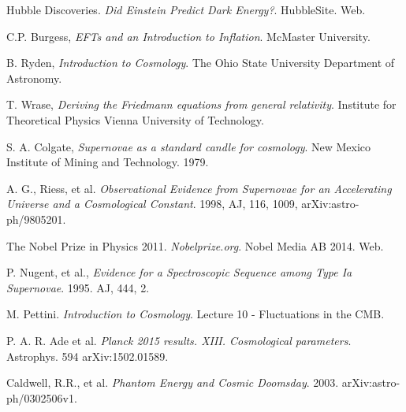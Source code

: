 \documentclass[12pt]{article}
\begin{document}
	\begin{thebibliography}{999}
	
	Hubble Discoveries. 
	\emph{Did Einstein Predict Dark Energy?}. 
	HubbleSite. Web.
	
  	C.P. Burgess,
  	\emph{EFTs and an Introduction to Inflation}.
  	McMaster University.
	
	B. Ryden, 
	\emph{Introduction to Cosmology}.
	The Ohio State University Department of Astronomy.
	
	T. Wrase,
	\emph{Deriving the Friedmann equations from general relativity}.
	Institute for Theoretical Physics Vienna University of Technology.
	
	S. A. Colgate, 
	\emph{Supernovae as a standard candle for cosmology}.
	New Mexico Institute of Mining and Technology. 1979.	
	
	A. G., Riess, et al.
	\emph{Observational Evidence from Supernovae for an Accelerating Universe and a Cosmological Constant}.
	1998, AJ, 116, 1009, arXiv:astro-ph/9805201.
	
	The Nobel Prize in Physics 2011. 
	\emph{Nobelprize.org}.
	Nobel Media AB 2014. Web. 
	
	P. Nugent, et al., 
	\emph{Evidence for a Spectroscopic Sequence among Type Ia Supernovae}.
	1995. AJ, 444, 2.
	
	M. Pettini. 
	\emph{Introduction to Cosmology}.
	Lecture 10 - Fluctuations in the CMB.
	
	 P. A. R. Ade et al. 
	\emph{Planck 2015 results. XIII. Cosmological parameters}.
	Astrophys. 594 arXiv:1502.01589. 
	
	 Caldwell, R.R., et al.
	 \emph{Phantom Energy and Cosmic Doomsday}.
	 2003. arXiv:astro-ph/0302506v1.

\end{thebibliography}
\end{document}
